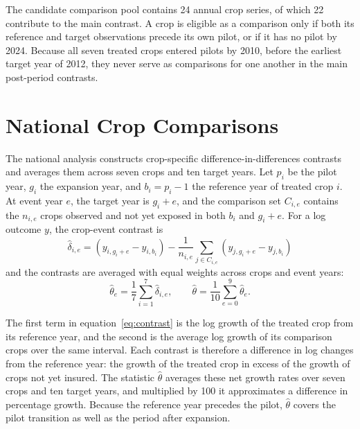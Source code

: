 The candidate comparison pool contains 24 annual crop series, of which 22 contribute to the main contrast. A crop is eligible as a comparison only if both its reference and target observations precede its own pilot, or if it has no pilot by 2024. Because all seven treated crops entered pilots by 2010, before the earliest target year of 2012, they never serve as comparisons for one another in the main post-period contrasts.

\section{National Crop Comparisons}\label{sec:national_design}

The national analysis constructs crop-specific difference-in-differences contrasts and averages them across seven crops and ten target years. Let $p_{i}$ be the pilot year, $g_{i}$ the expansion year, and $b_{i} = p_{i} - 1$ the reference year of treated crop $i$. At event year $e$, the target year is $g_{i} + e$, and the comparison set $C_{i,e}$ contains the $n_{i,e}$ crops observed and not yet exposed in both $b_{i}$ and $g_{i} + e$. For a log outcome $y$, the crop-event contrast is
\begin{equation}\label{eq:contrast}
\widehat{\delta}_{i,e} = \left( y_{i,g_{i} + e} - y_{i,b_{i}} \right) - \frac{1}{n_{i,e}}\sum_{j \in C_{i,e}}\left( y_{j,g_{i} + e} - y_{j,b_{i}} \right)
\end{equation}
and the contrasts are averaged with equal weights across crops and event years:
\begin{equation}\label{eq:average}
\widehat{\theta}_{e} = \frac{1}{7}\sum_{i = 1}^{7}\widehat{\delta}_{i,e},\qquad \widehat{\theta} = \frac{1}{10}\sum_{e = 0}^{9}\widehat{\theta}_{e}.
\end{equation}

The first term in equation~\eqref{eq:contrast} is the log growth of the treated crop from its reference year, and the second is the average log growth of its comparison crops over the same interval. Each contrast is therefore a difference in log changes from the reference year: the growth of the treated crop in excess of the growth of crops not yet insured. The statistic $\widehat{\theta}$ averages these net growth rates over seven crops and ten target years, and multiplied by 100 it approximates a difference in percentage growth. Because the reference year precedes the pilot, $\widehat{\theta}$ covers the pilot transition as well as the period after expansion.

